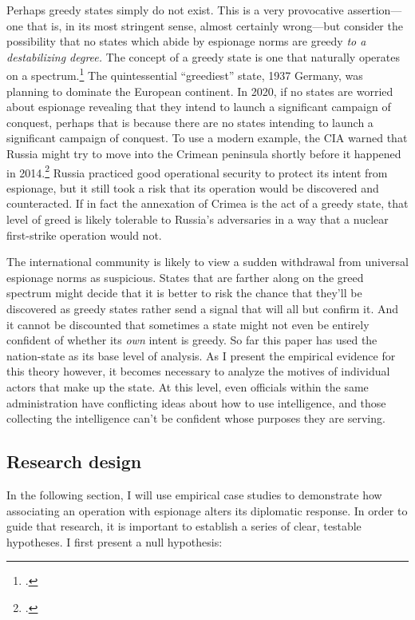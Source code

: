 \documentclass[14pt]{extarticle}
\begin{document}
Perhaps greedy states simply do not exist. This is a very provocative assertion---one that is, in its most stringent sense, almost certainly wrong---but consider the possibility that no states which abide by espionage norms are greedy \emph{to a destabilizing degree.} The concept of a greedy state is one that naturally operates on a spectrum.\footcite[p.~39. Throughout his book, Glaser simplifies and complicates his theory as is necessary for the particular analysis he is performing. Greedy states can be understood as the opposite of security-seeking states, or it can be its own independant variable, allowing for the possibility of states that are greedy \emph{and} security-seeking, or just one of the two.]{glaser_rational_2010} The quintessential \enquote{greediest} state, 1937 Germany, was planning to dominate the European continent. In 2020, if no states are worried about espionage revealing that they intend to launch a significant campaign of conquest, perhaps that is because there are no states intending to launch a significant campaign of conquest. To use a modern example, the CIA warned that Russia might try to move into the Crimean peninsula shortly before it happened in 2014.\footcite{hosenball_ukraine_2014} Russia practiced good operational security to protect its intent from espionage, but it still took a risk that its operation would be discovered and counteracted. If in fact the annexation of Crimea is the act of a greedy state, that level of greed is likely tolerable to Russia's adversaries in a way that a nuclear first-strike operation would not.

The international community is likely to view a sudden withdrawal from universal espionage norms as suspicious. States that are farther along on the greed spectrum might decide that it is better to risk the chance that they'll be discovered as greedy states rather send a signal that will all but confirm it. And it cannot be discounted that sometimes a state might not even be entirely confident of whether its \emph{own} intent is greedy. So far this paper has used the nation-state as its base level of analysis. As I present the empirical evidence for this theory however, it becomes necessary to analyze the motives of individual actors that make up the state. At this level, even officials within the same administration have conflicting ideas about how to use intelligence, and those collecting the intelligence can't be confident whose purposes they are serving.

\subsection{Research design}
In the following section, I will use empirical case studies to demonstrate how associating an operation with espionage alters its diplomatic response. In order to guide that research, it is important to establish a series of clear, testable hypotheses. I first present a null hypothesis:
\end{document}
